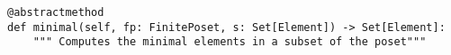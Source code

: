 \par\begin{minipage}{68ex}
\begin{verbatim}
@abstractmethod
def minimal(self, fp: FinitePoset, s: Set[Element]) -> Set[Element]:
    """ Computes the minimal elements in a subset of the poset"""
\end{verbatim}
\end{minipage}\par
